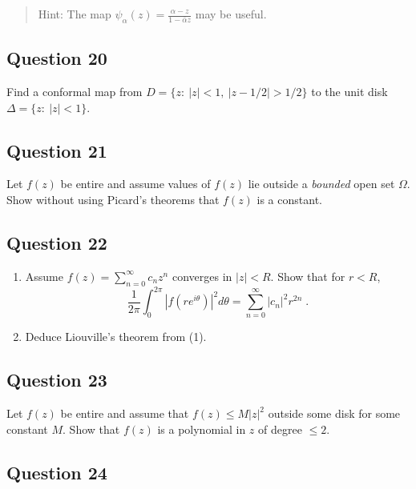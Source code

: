 \documentclass[12pt]{article}
\begin{document}
\begin{quote}
Hint: The map
\(\displaystyle{\psi_{\alpha}(z)=\frac{\alpha-z}{1-\bar{\alpha}z}}\) may
be useful.
\end{quote}

\hypertarget{question-20-2}{%
\subsection{Question 20}\label{question-20-2}}

Find a conformal map from \(D = \{z :\  |z| < 1,\ |z - 1/2| > 1/2\}\) to
the unit disk \(\Delta=\{z: \ |z|<1\}\).

\hypertarget{question-21-2}{%
\subsection{Question 21}\label{question-21-2}}

Let \(f(z)\) be entire and assume values of \(f(z)\) lie outside a
\emph{bounded} open set \(\Omega\). Show without using Picard's theorems
that \(f(z)\) is a constant.

\hypertarget{question-22-2}{%
\subsection{Question 22}\label{question-22-2}}

\begin{enumerate}
\def\labelenumi{(\arabic{enumi})}
\item
  Assume \(\displaystyle f(z) = \sum_{n=0}^\infty c_n z^n\) converges in
  \(|z| < R\). Show that for \(r <R\),
  \[\frac{1}{2 \pi} \int_0^{2 \pi} |f(r e^{i \theta})|^2 d \theta
  = \sum_{n=0}^\infty |c_n|^2 r^{2n} \; .\]
\item
  Deduce Liouville's theorem from (1).
\end{enumerate}

\hypertarget{question-23-2}{%
\subsection{Question 23}\label{question-23-2}}

Let \(f(z)\) be entire and assume that \(f(z) \leq M |z|^2\) outside
some disk for some constant \(M\). Show that \(f(z)\) is a polynomial in
\(z\) of degree \(\leq 2\).

\hypertarget{question-24-2}{%
\subsection{Question 24}\label{question-24-2}}
\end{document}
